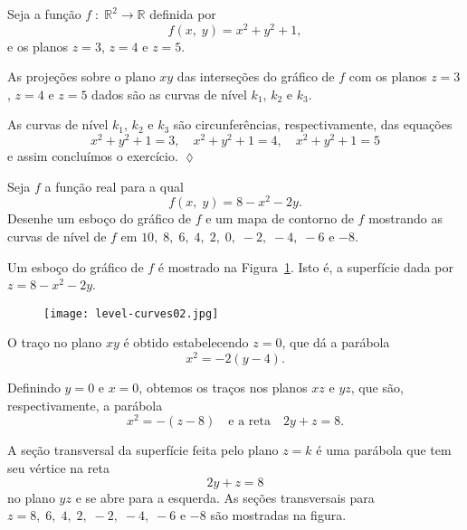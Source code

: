 \begin{exer}
	Seja a função \(f\; \colon\; \mathbb{R}^{2} \to \mathbb{R}\) definida por
	\begin{equation*}
		f(x,\; y)= x^{2}+y^{2}+1,
	\end{equation*}
	e os planos \(z=3\), \(z=4\) e \( z=5\).
\end{exer}

\solo
As projeções sobre o plano \(xy\) das interseções do gráfico de \(f\) com os planos 
\(z=3\), \(z=4\) e \(z=5\) dados são as curvas de nível \(k_{1}\), \(k_{2}\) e \( k_{3}\).

As curvas de nível \(k_{1}\), \(k_{2}\) e \(k_{3}\) são circunferências, respectivamente, das equações 
\begin{equation*}
	x^{2}+y^{2}+1=3, \quad x^{2}+y^{2}+1=4, \quad x^{2}+y^{2}+1=5
\end{equation*}
e assim concluímos o exercício. \hfill \(\lozenge\) 

\begin{exer}
	Seja \(f\) a função real para a qual
	\begin{equation*}
		f(x,\; y) = 8-x^{2}-2y.
	\end{equation*}
	Desenhe um esboço do gráfico de \(f\) e um mapa de contorno de \(f\) mostrando as curvas de nível de \(f\) em 
	\(10,\; 8,\; 6,\; 4,\; 2,\; 0,\; -2,\; -4,\; -6\) e \(-8\).
\end{exer}

\solo
Um esboço do gráfico de \(f\) é mostrado na Figura~\ref{fig:17-1-8}. Isto é, a superfície dada por \(z=8-x^{2}-2y\). 
%
\begin{figure}[H]
	\centering
	\texttt{[image: level-curves02.jpg]}
	\caption{}
	\label{fig:17-1-8}
\end{figure}
%

O traço no plano \(xy\) é obtido estabelecendo 
\(z=0\), que dá a parábola  
\begin{equation*}
	x^{2}=-2(y-4).
\end{equation*} 

Definindo \(y=0\) e \(x=0\), obtemos os traços nos planos \(xz\) e \(yz\), que são, respectivamente, a parábola 
\begin{equation*}
	x^{2} =-(z-8)\quad  \textrm{e a reta}\quad  2y+z=8.
\end{equation*}

A seção transversal da superfície feita pelo plano \(z=k\) é uma parábola que tem seu vértice na reta 
\begin{equation*}
	2y+z=8
\end{equation*} 
no plano \(yz\) e se abre para a esquerda. As seções transversais para \(z = 8,\; 6,\; 4,\; 2,\; -2,\; -4,\; -6\) e \(-8\) são mostradas na figura.

